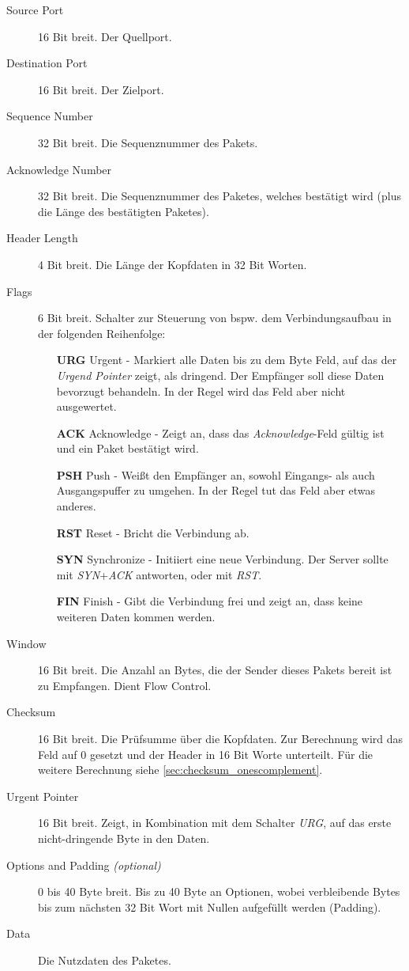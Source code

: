 \documentclass[a4paper, 11pt, accentcolor = tud3b]{tudreport}
\begin{document}
	            \begin{description}
	            	\item[Source Port] 16 Bit breit. Der Quellport.
	            	\item[Destination Port] 16 Bit breit. Der Zielport.
	            	\item[Sequence Number] 32 Bit breit. Die Sequenznummer des Pakets.
	            	\item[Acknowledge Number] 32 Bit breit. Die Sequenznummer des Paketes, welches bestätigt wird (plus die Länge des bestätigten Paketes).
	            	\item[Header Length] 4 Bit breit. Die Länge der Kopfdaten in 32 Bit Worten.
	            	\item[Flags] 6 Bit breit. Schalter zur Steuerung von bspw. dem Verbindungsaufbau in der folgenden Reihenfolge:
		            	\begin{itemize}
		            		\item[\textbf{URG}] Urgent - Markiert alle Daten bis zu dem Byte Feld, auf das der \textit{Urgend Pointer} zeigt, als dringend. Der Empfänger soll diese Daten bevorzugt behandeln. In der Regel wird das Feld aber nicht ausgewertet.
		            		\item[\textbf{ACK}] Acknowledge - Zeigt an, dass das \textit{Acknowledge}-Feld gültig ist und ein Paket bestätigt wird.
		            		\item[\textbf{PSH}] Push - Weißt den Empfänger an, sowohl Eingangs- als auch Ausgangspuffer zu umgehen. In der Regel tut das Feld aber etwas anderes.
		            		\item[\textbf{RST}] Reset - Bricht die Verbindung ab.
		            		\item[\textbf{SYN}] Synchronize - Initiiert eine neue Verbindung. Der Server sollte mit \textit{SYN}+\textit{ACK} antworten, oder mit \textit{RST}.
		            		\item[\textbf{FIN}] Finish - Gibt die Verbindung frei und zeigt an, dass keine weiteren Daten kommen werden.
		            	\end{itemize}
	            	\item[Window] 16 Bit breit. Die Anzahl an Bytes, die der Sender dieses Pakets bereit ist zu Empfangen. Dient Flow Control.
	            	\item[Checksum] 16 Bit breit. Die Prüfsumme über die Kopfdaten. Zur Berechnung wird das Feld auf 0 gesetzt und der Header in 16 Bit Worte unterteilt. Für die weitere Berechnung siehe \ref{sec:checksum_onescomplement}.
	            	\item[Urgent Pointer] 16 Bit breit. Zeigt, in Kombination mit dem Schalter \textit{URG}, auf das erste nicht-dringende Byte in den Daten.
		        	\item[Options and Padding \textit{(optional)}] 0 bis 40 Byte breit. Bis zu 40 Byte an Optionen, wobei verbleibende Bytes bis zum nächsten 32 Bit Wort mit Nullen aufgefüllt werden (Padding).
	            	\item[Data] Die Nutzdaten des Paketes.
	            \end{description}
\end{document}
